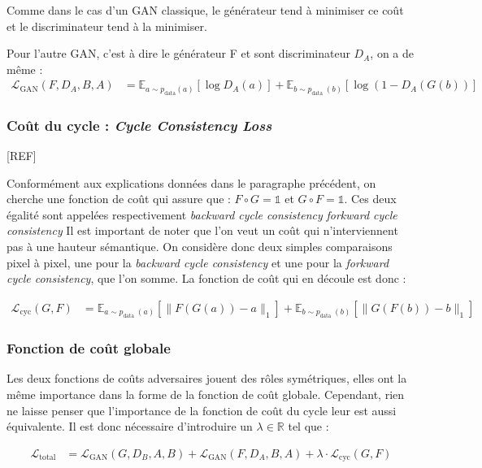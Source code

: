 Comme dans le cas d'un GAN classique, le générateur tend à minimiser ce coût et le discriminateur tend à la minimiser.

Pour l'autre GAN, c'est à dire le générateur F et sont discriminateur $D_A$, on a de même : $$\begin{aligned}
\mathcal{L}_{\mathrm{GAN}}\left(F, D_{A}, B, A\right) &=\mathbb{E}_{a \sim p_{\mathrm{data}}(a)}\left[\log D_{A}(a)\right] +\mathbb{E}_{b \sim p_{\text {data }}(b)}\left[\log \left(1-D_{A}(G(b))\right]\right.
\end{aligned}$$

\subsubsection{Coût du cycle : \textit{Cycle Consistency Loss}}

[REF]

Conformément aux explications données dans le paragraphe précédent, on cherche une fonction de coût qui assure que : $ F \circ G = \mathbb{1} $ et $ G \circ F = \mathbb{1} $. Ces deux égalité sont appelées respectivement \textit{backward cycle consistency} \textit{forkward cycle consistency} Il est important de noter que l'on veut un coût qui n'interviennent pas à une hauteur sémantique. On considère donc deux simples comparaisons pixel à pixel, une pour la \textit{backward cycle consistency} et une pour la \textit{forkward cycle consistency}, que l'on somme. La fonction de coût qui en découle est donc :

$$\begin{aligned}
\mathcal{L}_{\mathrm{cyc}}(G, F) &=\mathbb{E}_{a \sim p_{\text {data }}(a)}\left[\|F(G(a))-a\|_{1}\right] +\mathbb{E}_{b \sim p_{\text {data }}(b)}\left[\|G(F(b))-b\|_{1}\right]
\end{aligned}$$

\subsubsection{Fonction de coût globale}

Les deux fonctions de coûts adversaires jouent des rôles symétriques, elles ont la même importance dans la forme de la fonction de coût globale. Cependant, rien ne laisse penser que l'importance de la fonction de coût du cycle leur est aussi équivalente. Il est donc nécessaire d'introduire un $\lambda \in \mathbb{R}$ tel que :

$$\begin{aligned}
\mathcal{L}_{\text{total}} &=\mathcal{L}_{\mathrm{GAN}}\left(G, D_{B}, A, B\right) +\mathcal{L}_{\mathrm{GAN}}\left(F, D_{A}, B, A\right) +\lambda \cdot \mathcal{L}_{\mathrm{cyc}}(G, F)
\end{aligned}$$

